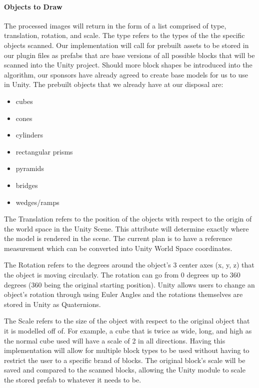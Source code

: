 \documentclass[12pt]{article}
\providecommand{\tightlist}{%
  \setlength{\itemsep}{0pt}\setlength{\parskip}{0pt}}
\begin{document}
\paragraph{Objects to Draw}\label{objects-to-draw}

The processed images will return in the form of a list comprised of
type, translation, rotation, and scale. The type refers to the types of
the the specific objects scanned. Our implementation will call for
prebuilt assets to be stored in our plugin files as prefabs that are
base versions of all possible blocks that will be scanned into the Unity
project. Should more block shapes be introduced into the algorithm, our
sponsors have already agreed to create base models for us to use in
Unity. The prebuilt objects that we already have at our disposal are:

\begin{itemize}
\tightlist
\item
  cubes
\item
  cones
\item
  cylinders
\item
  rectangular prisms
\item
  pyramids
\item
  bridges
\item
  wedges/ramps
\end{itemize}

The Translation refers to the position of the objects with respect to
the origin of the world space in the Unity Scene. This attribute will
determine exactly where the model is rendered in the scene. The current
plan is to have a reference measurement which can be converted into
Unity World Space coordinates.

The Rotation refers to the degrees around the object's 3 center axes (x,
y, z) that the object is moving circularly. The rotation can go from 0
degrees up to 360 degrees (360 being the original starting position).
Unity allows users to change an object's rotation through using Euler
Angles and the rotations themselves are stored in Unity as Quaternions.

The Scale refers to the size of the object with respect to the original
object that it is modelled off of. For example, a cube that is twice as
wide, long, and high as the normal cube used will have a scale of 2 in
all directions. Having this implementation will allow for multiple block
types to be used without having to restrict the user to a specific brand
of blocks. The original block's scale will be saved and compared to the
scanned blocks, allowing the Unity module to scale the stored prefab to
whatever it needs to be.
\end{document}
